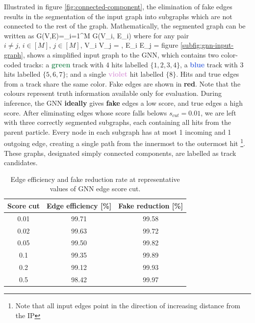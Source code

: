 Illustrated in figure \ref{fig:connected-component}, the elimination of fake edges results in the segmentation of the input graph into subgraphs which are not connected to the rest of the graph. Mathematically, the segmented graph can be written as
\beq
\label{eq:11.2}
G(V,E)=\bigcup_{i=1}^{M} G(V_i, E_i)
\eeq
where for any pair $i\neq j,\,i\in [M], \, j\in[M]$, 
\beq
\label{eq:11.3}
V_i \cap V_j = \varnothing, \quad E_i \cap E_j = \varnothing 
\eeq
figure \ref{subfig:gnn-input-graph}, shows a simplified input graph to the GNN, which contains two color-coded tracks: a \textbf{\textcolor{SeaGreen}{green}} track with 4 hits labelled $\{1,2,3,4\}$, a \textbf{\textcolor{RoyalBlue}{blue}} track with 3 hits labelled $\{5,6,7\}$; and a single \textbf{\textcolor{Plum}{violet}} hit labelled $\{8\}$. 
Hits and true edges from a track share the same color. 
Fake edges are shown in \textbf{\textcolor{BrickRed}{red}}. 
Note that the colours represent truth information available only for evaluation. 
During inference, the GNN \textbf{ideally} gives \textbf{\textcolor{BrickRed}{fake}} edges a low score, and true edges a high score. 
After eliminating edges whose score falls belows $s_{cut} = 0.01$, we are left with three correctly segmented subgraphs, each containing all hits from the parent particle. 
Every node in each subgraph has at most 1 incoming and 1 outgoing edge, creating a single path from the innermost to the outermost hit \footnote{Note that all input edges point in the direction of increasing distance from the IP}. 
These graphs, designated simply connected components, are labelled as track candidates.

\begin{table}[h!]
    \centering
    \begin{tabular}{c|c|c}
       Score cut  & Edge efficiency [\%] & Fake reduction [\%] \\ \hline \hline
        0.01         & 99.71  &  99.58 \\
        0.02 & 99.63 & 99.72 \\
        0.05 & 99.50 & 99.82  \\
         0.1 & 99.35 & 99.89 \\
        0.2 & 99.12 & 99.93 \\
        0.5 & 98.42 & 99.97 \\ 
        \hline
    \end{tabular}
    \caption{Edge efficiency and fake reduction rate at representative values of GNN edge score cut. }
    \label{tab:score-cuts}
\end{table}

